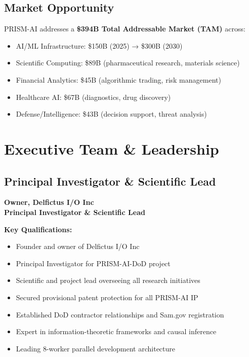 \documentclass[11pt,letterpaper]{article}
\begin{document}
\subsection{Market Opportunity}

PRISM-AI addresses a \textbf{\$394B Total Addressable Market (TAM)} across:
\begin{itemize}
    \item AI/ML Infrastructure: \$150B (2025) → \$300B (2030)
    \item Scientific Computing: \$89B (pharmaceutical research, materials science)
    \item Financial Analytics: \$45B (algorithmic trading, risk management)
    \item Healthcare AI: \$67B (diagnostics, drug discovery)
    \item Defense/Intelligence: \$43B (decision support, threat analysis)
\end{itemize}

\newpage

\section{Executive Team \& Leadership}

\subsection{Principal Investigator \& Scientific Lead}

\begin{tcolorbox}[colback=lightgray,colframe=primaryblue,title=Ididia Serfaty]
\textbf{Owner, Delfictus I/O Inc}\\
\textbf{Principal Investigator \& Scientific Lead}

\vspace{0.3cm}
\textbf{Key Qualifications:}
\begin{itemize}[leftmargin=*]
    \item Founder and owner of Delfictus I/O Inc
    \item Principal Investigator for PRISM-AI-DoD project
    \item Scientific and project lead overseeing all research initiatives
    \item Secured provisional patent protection for all PRISM-AI IP
    \item Established DoD contractor relationships and Sam.gov registration
    \item Expert in information-theoretic frameworks and causal inference
    \item Leading 8-worker parallel development architecture
\end{itemize}
\end{tcolorbox}
\end{document}
